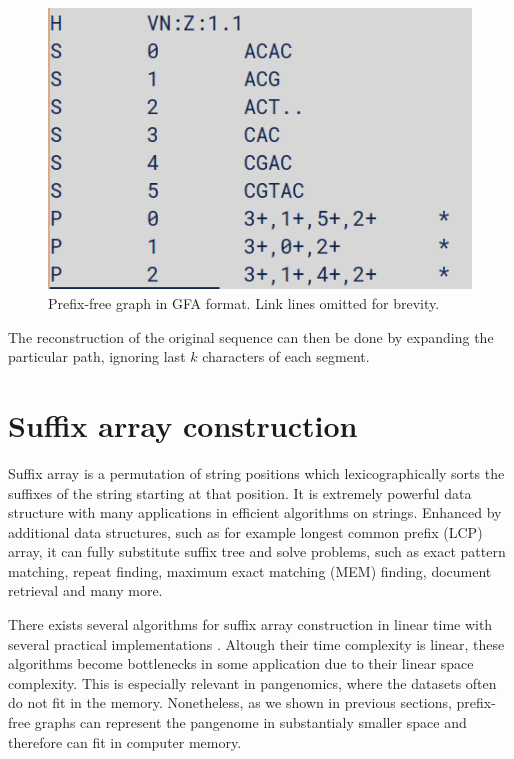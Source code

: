 \documentclass[twocolumn]{ceurart}
\begin{document}
\begin{figure}
    \centering
    \includegraphics[width=\linewidth]{images/pfg_gfa.png}
    \caption{Prefix-free graph in GFA format. Link lines omitted for brevity.}
    \label{fig:gfa}
\end{figure}


The reconstruction of the original sequence can then be done by expanding 
the particular path, ignoring last $k$ characters of each segment.

\section{Suffix array construction}
Suffix array is a permutation of string positions which lexicographically
sorts the suffixes of the string starting at that position.
It is extremely powerful data structure with many applications in efficient
algorithms on strings.
Enhanced by additional data structures, such as for example longest common
prefix (LCP) array, it can fully substitute suffix tree and solve problems,
such as exact pattern matching, repeat finding, maximum exact matching (MEM)
finding, document retrieval and many more.

There exists several algorithms for suffix array construction in linear time
\cite{} with several practical implementations \cite{}.
Altough their time complexity is linear, these algorithms become bottlenecks in
some application due to their linear space complexity.
This is especially relevant in pangenomics, where the datasets often do not fit
in the memory.
Nonetheless, as we shown in previous sections, prefix-free graphs can represent
the pangenome in substantialy smaller space and therefore can fit in computer
memory.
\end{document}
